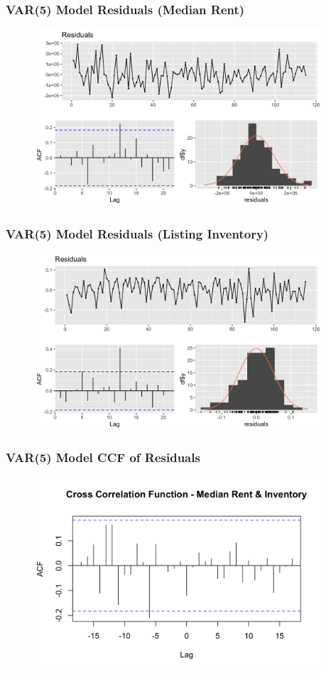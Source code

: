 \documentclass[t]{beamer}
\begin{document}
\begin{frame}
\frametitle{VAR(5) Model Residuals (Median Rent)}
\begin{figure}
\includegraphics[width=4.2in]{var1_residuals.png}
\end{figure}
\end{frame}

\begin{frame}
\frametitle{VAR(5) Model Residuals (Listing Inventory)}
\begin{figure}
\includegraphics[width=4.2in]{var2_residuals.png}
\end{figure}
\end{frame}

\begin{frame}
\frametitle{VAR(5) Model CCF of Residuals}
\begin{figure}
\includegraphics[width=4.2in]{var_ccf_residuals.png}
\end{figure}
\end{frame}
\end{document}
